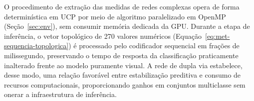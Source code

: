 O procedimento de extração das medidas de redes complexas opera de forma determinística em UCP por meio de algoritmo paralelizado em OpenMP (Seção~\ref{sec:env}), sem consumir memória dedicada da GPU. Durante a etapa de inferência, o vetor topológico de 270 valores numéricos (Equação~\ref{eq:met-sequencia-topologica}) é processado pelo codificador sequencial em frações de milissegundo, preservando o tempo de resposta da classificação praticamente inalterado frente ao modelo puramente visual. A rede de dupla via estabelece, desse modo, uma relação favorável entre estabilização preditiva e consumo de recursos computacionais, proporcionando ganhos em conjuntos multiclasse sem onerar a infraestrutura de inferência.
